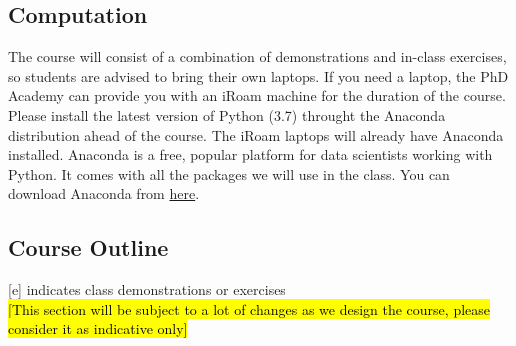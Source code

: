 \documentclass{amsart}
\theoremstyle{definition}
\theoremstyle{remark}
\numberwithin{equation}{section}
\begin{document}
\subsection*{Computation}

The course will consist of a combination of demonstrations and in-class exercises, so students are advised to bring their own laptops. If you need a laptop, the PhD Academy can provide you with an iRoam machine for the duration of the course.\\

Please install the latest version of Python (3.7) throught the Anaconda distribution ahead of the course. The iRoam laptops will already have Anaconda installed. Anaconda is a free, popular platform for data scientists working with Python. It comes with all the packages we will use in the class. You can download Anaconda from \href{https://www.anaconda.com/distribution/}{here}.

\subsection*{Course Outline}

[e] indicates class demonstrations or exercises\\

\hl{[This section will be subject to a lot of changes as we design the course, please consider it as indicative only]} \\
\end{document}
